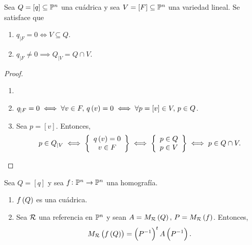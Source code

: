 \begin{prop}
    Sea $Q= \left[ q \right] \subseteq \mathbb{P} ^n$ una cuádrica y sea $V = \left[ F \right] \subseteq \mathbb{P} ^n$ una variedad lineal. Se satisface que
    \begin{enumerate}[(1)]
        \item $q_{|F} = 0 \iff V \subseteq Q$.
        \item $q_{|F} \neq 0 \implies Q_{|V} = Q \cap V $.
    \end{enumerate}
\end{prop}

\begin{proof}
    \begin{enumerate}[(1)] \item[]
        \item $q_{|F} = 0 \iff \forall v \in F, \, q \left( v \right) = 0 \iff \forall p = \left[ v \right] \in V, \, p \in Q$.
        \item Sea $p=\left[ v \right]$. Entonces, 
        \[
            p \in Q_{|V} \iff \left\{ \begin{array}{c} q \left( v \right) = 0 \\ v \in F \end{array} \right\} \iff \left\{ \begin{array}{c} p \in Q \\ p \in V \end{array} \right\} \iff p \in Q\cap V.
        \]
    \end{enumerate}    
\end{proof}

\begin{prop}
     Sea $Q=\left[q \right]$ y sea $f \colon \mathbb{P}^n \to \mathbb{P}^n$ una homografía.
     \begin{enumerate}[(1)]
        \item $f\left( Q \right)$ es una cuádrica.
        \item Sea $\mathcal{R}$ una referencia en $\mathbb{P}^n$ y sean $A=M_{\mathcal{R}} \left( Q \right), \, P=M_{\mathcal{R}} \left( f \right)$. Entonces,
            \[
                M_{\mathcal{R}} \left( f \left( Q \right) \right) = \left( P^{-1} \right) ^t A \left( P^{-1} \right).
            \]
     \end{enumerate}
\end{prop}

